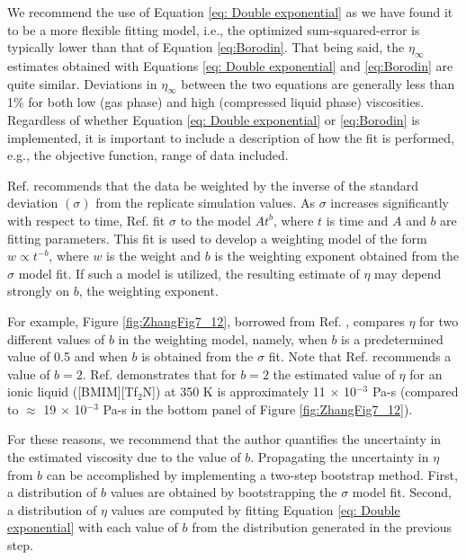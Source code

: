 \documentclass[9pt,bestpractices]{livecoms}
\begin{document}
We recommend the use of Equation \ref{eq: Double exponential} as we have found it to be a more flexible fitting model, i.e., the optimized sum-squared-error is typically lower than that of Equation \ref{eq:Borodin}. That being said, the $\eta_{\infty}$ estimates obtained with Equations \ref{eq: Double exponential} and \ref{eq:Borodin} are quite similar. Deviations in $\eta_{\infty}$ between the two equations are generally less than 1\% for both low (gas phase) and high (compressed liquid phase) viscosities. Regardless of whether Equation \ref{eq: Double exponential} or \ref{eq:Borodin} is implemented, it is important to include a description of how the fit is performed, e.g., the objective function, range of data included.

Ref. \cite{Zhang2015} recommends that the data be weighted by the inverse of the standard deviation $(\sigma)$ from the replicate simulation values. As $\sigma$ increases significantly with respect to time, Ref. \cite{Zhang2015} fit $\sigma$ to the model $A t^b$, where $t$ is time and $A$ and $b$ are fitting parameters. This fit is used to develop a weighting model of the form $w \propto t^{-b}$, where $w$ is the weight and $b$ is the weighting exponent obtained from the $\sigma$ model fit. If such a model is utilized, the resulting estimate of $\eta$ may depend strongly on $b$, the weighting exponent. 

For example, Figure \ref{fig:ZhangFig7_12}, borrowed from Ref. \cite{Zhang2015}, compares $\eta$ for two different values of $b$ in the weighting model, namely, when $b$ is a predetermined value of 0.5 and when $b$ is obtained from the $\sigma$ fit. Note that Ref. \cite{ReyCastro2006} recommends a value of $b=2$. Ref. \cite{Zhang2015} demonstrates that for $b=2$ the estimated value of $\eta$ for an ionic liquid ([BMIM][Tf$_2$N]) at 350 K is approximately 11 $\times$ 10$^{-3}$ Pa-s (compared to $\approx$ 19 $\times$ 10$^{-3}$ Pa-s in the bottom panel of Figure \ref{fig:ZhangFig7_12}). 

For these reasons, we recommend that the author quantifies the uncertainty in the estimated viscosity due to the value of $b$. Propagating the uncertainty in $\eta$ from $b$ can be accomplished by implementing a two-step bootstrap method. First, a distribution of $b$ values are obtained by bootstrapping the $\sigma$ model fit. Second, a distribution of $\eta$ values are computed by fitting Equation \ref{eq: Double exponential} with each value of $b$ from the distribution generated in the previous step.
\end{document}
